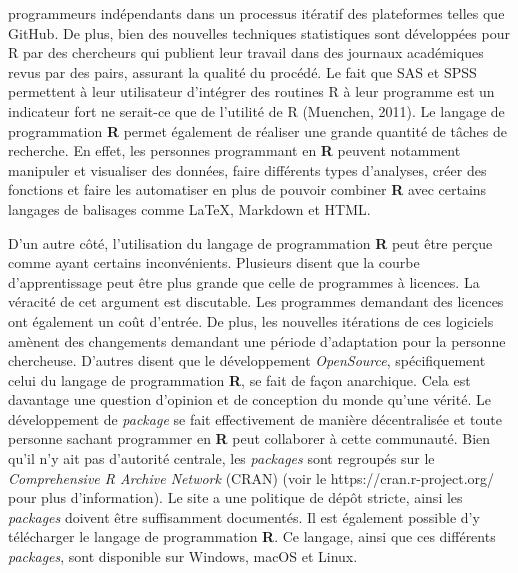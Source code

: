 \documentclass[
  letterpaper,
  DIV=11,
  numbers=noendperiod]{scrreprt}
\begin{document}
programmeurs indépendants dans un processus itératif des plateformes
telles que GitHub. De plus, bien des nouvelles techniques statistiques
sont développées pour R par des chercheurs qui publient leur travail
dans des journaux académiques revus par des pairs, assurant la qualité
du procédé. Le fait que SAS et SPSS permettent à leur utilisateur
d'intégrer des routines R à leur programme est un indicateur fort ne
serait-ce que de l'utilité de R (Muenchen, 2011). Le langage de
programmation \textbf{R} permet également de réaliser une grande
quantité de tâches de recherche. En effet, les personnes programmant en
\textbf{R} peuvent notamment manipuler et visualiser des données, faire
différents types d'analyses, créer des fonctions et faire les
automatiser en plus de pouvoir combiner \textbf{R} avec certains
langages de balisages comme LaTeX, Markdown et HTML.

D'un autre côté, l'utilisation du langage de programmation \textbf{R}
peut être perçue comme ayant certains inconvénients. Plusieurs disent
que la courbe d'apprentissage peut être plus grande que celle de
programmes à licences. La véracité de cet argument est discutable. Les
programmes demandant des licences ont également un coût d'entrée. De
plus, les nouvelles itérations de ces logiciels amènent des changements
demandant une période d'adaptation pour la personne chercheuse. D'autres
disent que le développement \emph{OpenSource}, spécifiquement celui du
langage de programmation \textbf{R}, se fait de façon anarchique. Cela
est davantage une question d'opinion et de conception du monde qu'une
vérité. Le développement de \emph{package} se fait effectivement de
manière décentralisée et toute personne sachant programmer en \textbf{R}
peut collaborer à cette communauté. Bien qu'il n'y ait pas d'autorité
centrale, les \emph{packages} sont regroupés sur le \emph{Comprehensive
R Archive Network} (CRAN) (voir le https://cran.r-project.org/ pour plus
d'information). Le site a une politique de dépôt stricte, ainsi les
\emph{packages} doivent être suffisamment documentés. Il est également
possible d'y télécharger le langage de programmation \textbf{R}. Ce
langage, ainsi que ces différents \emph{packages}, sont disponible sur
Windows, macOS et Linux.
\end{document}
